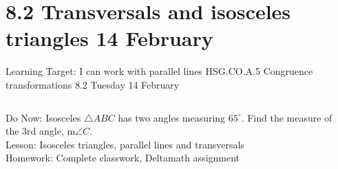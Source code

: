 \section{8.2 Transversals and isosceles triangles \hfill 14 February \,}
\begin{frame}{Learning Target: I can work with parallel lines}
  {HSG.CO.A.5 Congruence transformations \hfill \alert{8.2 Tuesday 14 February}}
  \begin{columns}
    Do Now: Isosceles $\triangle ABC$ has two angles measuring $65^\circ$. Find the measure of the 3rd angle, m$\angle C$.\\[0.5cm]
    Lesson: Isosceles triangles, parallel lines and transversals \\
    Homework: Complete classwork, Deltamath assignment
    \begin{flushright}
    \end{flushright}
  \end{columns}
\end{frame}

